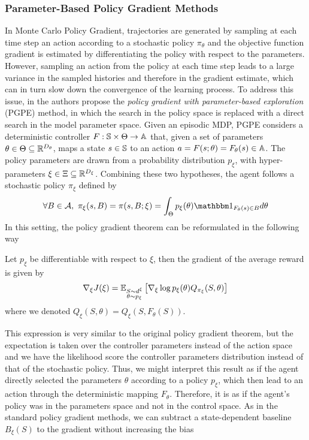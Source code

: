 \subsubsection{Parameter-Based Policy Gradient Methods}
In Monte Carlo Policy Gradient, trajectories are generated by sampling at each
time step an action according to a stochastic policy $\pi_\theta$ and the
objective function gradient is estimated by differentiating the policy with
respect to the parameters. However, sampling an action from the policy at each
time step leads to a large variance in the sampled histories and therefore in 
the gradient estimate, which can in turn slow down the convergence of the
learning process. To address this issue, in \cite{sehnke2008policy} the authors
propose the \emph{policy gradient with parameter-based exploration} (PGPE)
method, in which the search in the policy space is replaced with a direct
search in the model parameter space. Given an episodic MDP, PGPE considers a deterministic controller $F: \S \times
\Theta \to \A$ that, given a set of parameters $\theta \in \Theta \subseteq
\R^{D_\theta}$, maps a state $s \in \S$ to an action $a = F(s; \theta) =
F_\theta(s) \in \A$. The policy parameters are drawn from a probability distribution $p_\xi$, with hyper-parameters $\xi \in \Xi \subseteq \R^{D_\xi}$. Combining these two
hypotheses, the agent follows a stochastic policy $\pi_\xi$ defined by
\begin{equation}
	\forall B \in \calA ,\ \pi_\xi(s,B) = \pi(s, B; \xi) = \int_\Theta p_\xi(\theta) 
	\ind{F_{\theta}(s)\in B} d\theta
\end{equation}
In this setting, the policy gradient theorem can be reformulated in the following way 
\begin{theorem}
	Let $p_\xi$ be differentiable with respect to $\xi$, then the gradient of the average reward is given by
	\begin{equation}
		\nabla_\xi J(\xi) = \E[\substack{S \sim d^\xi\\\theta \sim p_\xi}]{\nabla_\xi \log p_\xi(\theta) Q_{\pi_\xi}(S, \theta)}
	\end{equation}
	where we denoted $Q_\xi(S, \theta) = Q_\xi(S, F_\theta(S))$.
\end{theorem}
This expression is very similar to the original policy gradient theorem, but
the expectation is taken over the controller parameters instead of the action space and we have the likelihood score the controller parameters distribution instead of that of the stochastic policy. Thus, we might interpret this result as if the agent directly selected the parameters $\theta$ according to a policy $p_\xi$, which then lead to an action through the deterministic mapping $F_\theta$. Therefore, it is as if the agent's policy was in the parameters space and not in the control space. As in the standard policy gradient methods, we can subtract a state-dependent baseline $B_\xi(S)$ to the gradient without increasing the bias
